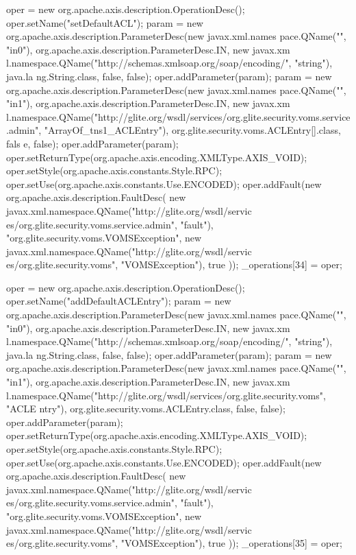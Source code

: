 \begin{DoxyCode}
{        oper = new org.apache.axis.description.OperationDesc();
        oper.setName("setDefaultACL");
        param = new org.apache.axis.description.ParameterDesc(new javax.xml.names
      pace.QName("", "in0"), org.apache.axis.description.ParameterDesc.IN, new javax.xm
      l.namespace.QName("http://schemas.xmlsoap.org/soap/encoding/", "string"), java.la
      ng.String.class, false, false);
        oper.addParameter(param);
        param = new org.apache.axis.description.ParameterDesc(new javax.xml.names
      pace.QName("", "in1"), org.apache.axis.description.ParameterDesc.IN, new javax.xm
      l.namespace.QName("http://glite.org/wsdl/services/org.glite.security.voms.service
      .admin", "ArrayOf_tns1_ACLEntry"), org.glite.security.voms.ACLEntry[].class, fals
      e, false);
        oper.addParameter(param);
        oper.setReturnType(org.apache.axis.encoding.XMLType.AXIS_VOID);
        oper.setStyle(org.apache.axis.constants.Style.RPC);
        oper.setUse(org.apache.axis.constants.Use.ENCODED);
        oper.addFault(new org.apache.axis.description.FaultDesc(
                      new javax.xml.namespace.QName("http://glite.org/wsdl/servic
      es/org.glite.security.voms.service.admin", "fault"),
                      "org.glite.security.voms.VOMSException",
                      new javax.xml.namespace.QName("http://glite.org/wsdl/servic
      es/org.glite.security.voms", "VOMSException"), 
                      true
                     ));
        _operations[34] = oper;

        oper = new org.apache.axis.description.OperationDesc();
        oper.setName("addDefaultACLEntry");
        param = new org.apache.axis.description.ParameterDesc(new javax.xml.names
      pace.QName("", "in0"), org.apache.axis.description.ParameterDesc.IN, new javax.xm
      l.namespace.QName("http://schemas.xmlsoap.org/soap/encoding/", "string"), java.la
      ng.String.class, false, false);
        oper.addParameter(param);
        param = new org.apache.axis.description.ParameterDesc(new javax.xml.names
      pace.QName("", "in1"), org.apache.axis.description.ParameterDesc.IN, new javax.xm
      l.namespace.QName("http://glite.org/wsdl/services/org.glite.security.voms", "ACLE
      ntry"), org.glite.security.voms.ACLEntry.class, false, false);
        oper.addParameter(param);
        oper.setReturnType(org.apache.axis.encoding.XMLType.AXIS_VOID);
        oper.setStyle(org.apache.axis.constants.Style.RPC);
        oper.setUse(org.apache.axis.constants.Use.ENCODED);
        oper.addFault(new org.apache.axis.description.FaultDesc(
                      new javax.xml.namespace.QName("http://glite.org/wsdl/servic
      es/org.glite.security.voms.service.admin", "fault"),
                      "org.glite.security.voms.VOMSException",
                      new javax.xml.namespace.QName("http://glite.org/wsdl/servic
      es/org.glite.security.voms", "VOMSException"), 
                      true
                     ));
        _operations[35] = oper;

}
\end{DoxyCode}
